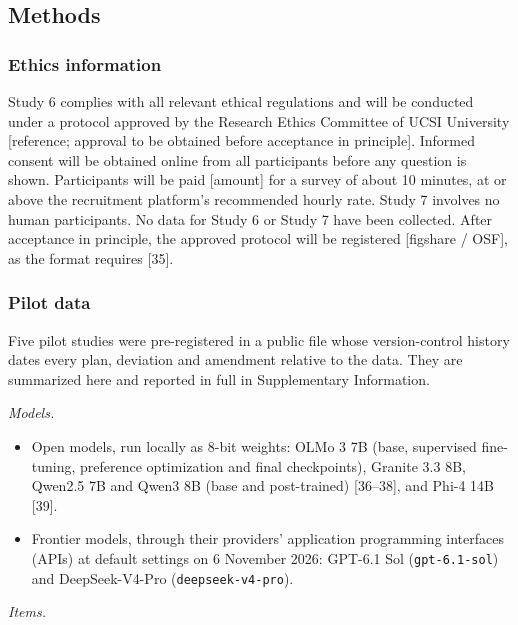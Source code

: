 \documentclass[
  11pt,
]{article}
\providecommand{\tightlist}{%
  \setlength{\itemsep}{0pt}\setlength{\parskip}{0pt}}
\begin{document}
\hypertarget{methods}{%
\subsection{Methods}\label{methods}}

\hypertarget{ethics-information}{%
\subsubsection{Ethics information}\label{ethics-information}}

Study 6 complies with all relevant ethical regulations and will be
conducted under a protocol approved by the Research Ethics Committee of
UCSI University {[}reference; approval to be obtained before acceptance
in principle{]}. Informed consent will be obtained online from all
participants before any question is shown. Participants will be paid
{[}amount{]} for a survey of about 10 minutes, at or above the
recruitment platform's recommended hourly rate. Study 7 involves no
human participants. No data for Study 6 or Study 7 have been collected.
After acceptance in principle, the approved protocol will be registered
{[}figshare / OSF{]}, as the format requires {[}35{]}.

\hypertarget{pilot-data}{%
\subsubsection{Pilot data}\label{pilot-data}}

Five pilot studies were pre-registered in a public file whose
version-control history dates every plan, deviation and amendment
relative to the data. They are summarized here and reported in full in
Supplementary Information.

\emph{Models.}

\begin{itemize}
\tightlist
\item
  Open models, run locally as 8-bit weights: OLMo 3 7B (base, supervised
  fine-tuning, preference optimization and final checkpoints), Granite
  3.3 8B, Qwen2.5 7B and Qwen3 8B (base and post-trained) {[}36--38{]},
  and Phi-4 14B {[}39{]}.
\item
  Frontier models, through their providers' application programming
  interfaces (APIs) at default settings on 6 November 2026: GPT-6.1 Sol
  (\texttt{gpt-6.1-sol}) and DeepSeek-V4-Pro (\texttt{deepseek-v4-pro}).
\end{itemize}

\emph{Items.}
\end{document}
